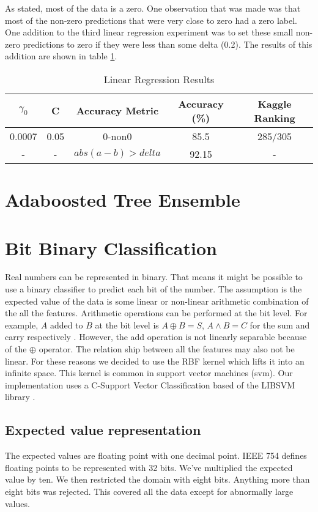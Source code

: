 \documentclass[pdftex,a4paper,12pt]{article}
\begin{document}
As stated, most of the data is a zero. One observation that was made was that most of the non-zero predictions that were very close to zero had a zero label. One addition to the third linear regression experiment was to set these small non-zero predictions to zero if they were less than some delta (0.2). The results of this addition are shown in table \ref{table:linAccModified}.
  \begin{table}[h]
        {\centering
          \begin{tabular}{|c|c|c|c|c|}
            \hline
             $\gamma_0$ & C & Accuracy Metric & Accuracy (\%) & Kaggle Ranking\\
            \hline
                0.0007 &   0.05        & 0-non0 & 85.5 & 285/305 \\
             \hline
                - &   -        & $abs(a - b) > delta$ & 92.15 & - \\
                  \hline
          \end{tabular}
          \caption{Linear Regression Results}          
          \label{table:linAccModified}}
  \end{table}


\section{Adaboosted Tree Ensemble}
\section{Bit Binary Classification}
Real numbers can be represented in binary.  That means it might be possible to use a binary classifier to predict each bit of the number.  The assumption is the expected value of the data is some linear or non-linear arithmetic combination of the all the features.  Arithmetic operations can be performed at the bit level.  For example, $A$ added to $B$ at the bit level is $A \oplus B = S$, $A \land B = C$ for the sum and carry respectively \cite{lancaster2001excel}.  However, the add operation is not linearly separable because of the $\oplus$ operator.  The relation ship between all the features may also not be linear.  For these reasons we decided to use the RBF kernel which lifts it into an infinite space. This kernel is common in support vector machines (svm).  Our implementation uses a C-Support Vector Classification based of the LIBSVM library \cite{LIBSVM}\cite{scikit-learn}.\\
\subsection{Expected value representation}
The expected values are floating point with one decimal point.  IEEE 754 defines floating points to be represented with 32 bits.  We've multiplied the expected value by ten.  We then restricted the domain with eight bits.  Anything more than eight bits was rejected.  This covered all the data except for abnormally large values.
\end{document}
